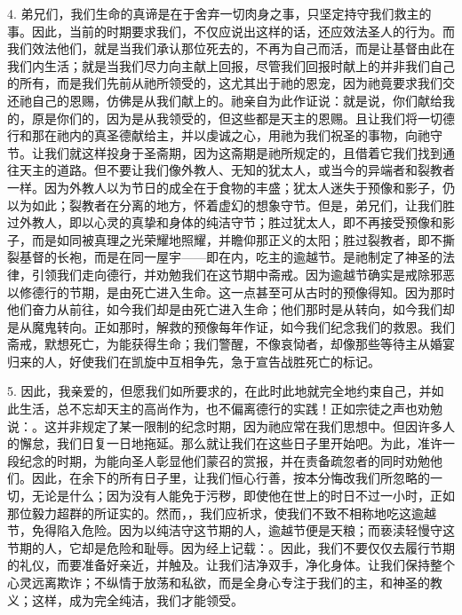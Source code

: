 4. 弟兄们，我们生命的真谛是在于舍弃一切肉身之事，只坚定持守我们救主的事。因此，当前的时期要求我们，不仅应说出这样的话，还应效法圣人的行为。而我们效法他们，就是当我们承认那位死去的，不再为自己而活，而是让基督由此在我们内生活；就是当我们尽力向主献上回报，尽管我们回报时献上的并非我们自己的所有，而是我们先前从祂所领受的，这尤其出于祂的恩宠，因为祂竟要求我们交还祂自己的恩赐，仿佛是从我们献上的。祂亲自为此作证说：就是说，你们献给我的，原是你们的，因为是从我领受的，但这些都是天主的恩赐。且让我们将一切德行和那在祂内的真圣德献给主，并以虔诚之心，用祂为我们祝圣的事物，向祂守节。让我们就这样投身于圣斋期，因为这斋期是祂所规定的，且借着它我们找到通往天主的道路。但不要让我们像外教人、无知的犹太人，或当今的异端者和裂教者一样。因为外教人以为节日的成全在于食物的丰盛；犹太人迷失于预像和影子，仍以为如此；裂教者在分离的地方，怀着虚幻的想象守节。但是，弟兄们，让我们胜过外教人，即以心灵的真挚和身体的纯洁守节；胜过犹太人，即不再接受预像和影子，而是如同被真理之光荣耀地照耀，并瞻仰那正义的太阳；胜过裂教者，即不撕裂基督的长袍，而是在同一屋宇——即在内，吃主的逾越节。是祂制定了神圣的法律，引领我们走向德行，并劝勉我们在这节期中斋戒。因为逾越节确实是戒除邪恶以修德行的节期，是由死亡进入生命。这一点甚至可从古时的预像得知。因为那时他们奋力从前往，如今我们却是由死亡进入生命；他们那时是从转向，如今我们却是从魔鬼转向。正如那时，解救的预像每年作证，如今我们纪念我们的救恩。我们斋戒，默想死亡，为能获得生命；我们警醒，不像哀恸者，却像那些等待主从婚宴归来的人，好使我们在凯旋中互相争先，急于宣告战胜死亡的标记。\par

5. 因此，我亲爱的，但愿我们如所要求的，在此时此地就完全地约束自己，并如此生活，总不忘却天主的高尚作为，也不偏离德行的实践！正如宗徒之声也劝勉说：。这并非规定了某一限制的纪念时期，因为祂应常在我们思想中。但因许多人的懈怠，我们日复一日地拖延。那么就让我们在这些日子里开始吧。为此，准许一段纪念的时期，为能向圣人彰显他们蒙召的赏报，并在责备疏忽者的同时劝勉他们。因此，在余下的所有日子里，让我们恒心行善，按本分悔改我们所忽略的一切，无论是什么；因为没有人能免于污秽，即使他在世上的时日不过一小时，正如那位毅力超群的所证实的。然而，，我们应祈求，使我们不致不相称地吃这逾越节，免得陷入危险。因为以纯洁守这节期的人，逾越节便是天粮；而亵渎轻慢守这节期的人，它却是危险和耻辱。因为经上记载：。因此，我们不要仅仅去履行节期的礼仪，而要准备好亲近，并触及。让我们洁净双手，净化身体。让我们保持整个心灵远离欺诈；不纵情于放荡和私欲，而是全身心专注于我们的主，和神圣的教义；这样，成为完全纯洁，我们才能领受。\par

